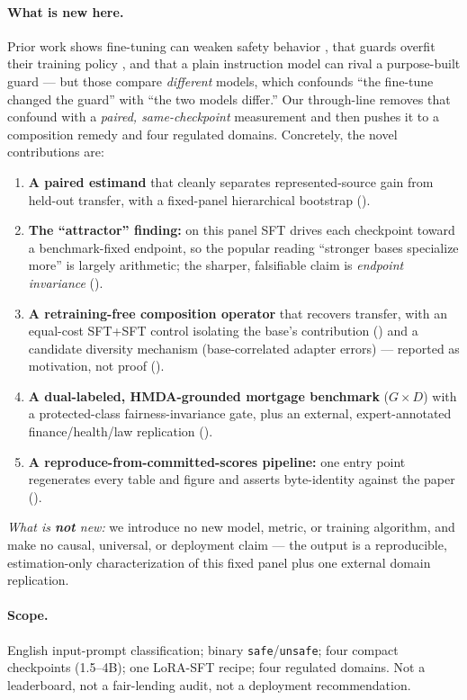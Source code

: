 \documentclass[11pt]{article}
\newcommand{\code}[1]{\texttt{\small #1}}
\begin{document}
\paragraph{What is new here.} Prior work shows fine-tuning can weaken safety behavior
\citep{hsiung2025guardrails}, that guards overfit their training policy
\citep{liu2026domaingeneralizable}, and that a plain instruction model can rival a purpose-built guard
\citep{bassani2024guardbench} --- but those compare \emph{different} models, which confounds ``the
fine-tune changed the guard'' with ``the two models differ.'' Our through-line removes that confound with
a \emph{paired, same-checkpoint} measurement and then pushes it to a composition remedy and four regulated
domains. Concretely, the novel contributions are:
\begin{enumerate}[leftmargin=1.7em,itemsep=1pt]
  \item \textbf{A paired estimand} that cleanly separates represented-source gain from held-out transfer,
  with a fixed-panel hierarchical bootstrap ().
  \item \textbf{The ``attractor'' finding:} on this panel SFT drives each checkpoint toward a benchmark-fixed
  endpoint, so the popular reading ``stronger bases specialize more'' is largely arithmetic; the sharper,
  falsifiable claim is \emph{endpoint invariance} ().
  \item \textbf{A retraining-free composition operator} that recovers transfer, with an equal-cost SFT+SFT
  control isolating the base's contribution () and a candidate diversity mechanism
  (base-correlated adapter errors) --- reported as motivation, not proof ().
  \item \textbf{A dual-labeled, HMDA-grounded mortgage benchmark} ($G\times D$) with a protected-class
  fairness-invariance gate, plus an external, expert-annotated finance/health/law replication
  ().
  \item \textbf{A reproduce-from-committed-scores pipeline:} one entry point regenerates every table and
  figure and asserts byte-identity against the paper ().
\end{enumerate}
\emph{What is \textbf{not} new:} we introduce no new model, metric, or training algorithm, and make no
causal, universal, or deployment claim --- the output is a reproducible, estimation-only characterization
of this fixed panel plus one external domain replication.

\paragraph{Scope.} English input-prompt classification; binary \code{safe}/\code{unsafe}; four compact
checkpoints (1.5--4B); one LoRA-SFT recipe; four regulated domains. Not a leaderboard, not a fair-lending
audit, not a deployment recommendation.
\end{document}
